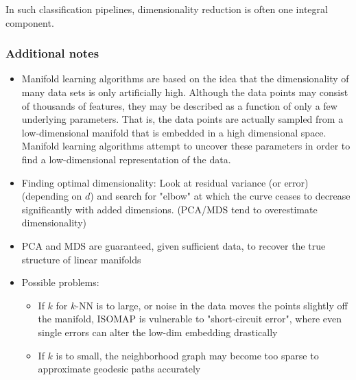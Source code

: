 In such classification pipelines, dimensionality reduction is often one integral component.

\subsubsection*{Additional notes}
\begin{itemize}
    \item Manifold learning algorithms are based on the idea that the dimensionality of many data sets is only artificially high. Although the data points may consist of thousands of features, they may be described as a function of only a few underlying parameters. That is, the data points are actually sampled from a low-dimensional manifold that is embedded in a high dimensional space. Manifold learning algorithms attempt to uncover these parameters in order to find a low-dimensional representation of the data.
    \item Finding optimal dimensionality: Look at residual variance (or error) (depending on \(d\)) and search for "elbow" at which the curve ceases to decrease significantly with added dimensions. (PCA/MDS tend to overestimate dimensionality)
    \item PCA and MDS are guaranteed, given sufficient data, to recover the true structure of linear manifolds
    \item Possible problems:

        \begin{itemize}
            \item If \(k\) for \(k\)-NN is to large, or noise in the data moves the points slightly off the manifold, ISOMAP is vulnerable to "short-circuit error", where even single errors can alter the low-dim embedding drastically
            \item If \(k\) is to small, the neighborhood graph may become too sparse to approximate geodesic paths accurately
        \end{itemize}

\end{itemize}
